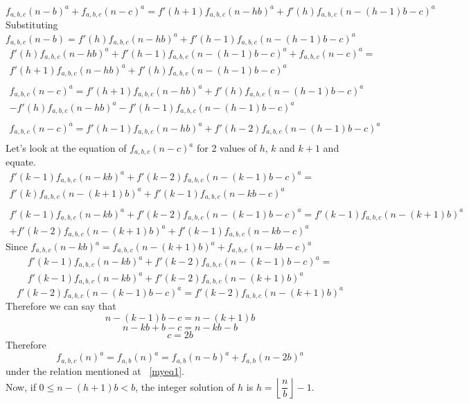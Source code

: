 \documentclass[preprint,12pt]{elsarticle}
\begin{document}
$$f_{a,b,c}(n-b)^a+f_{a,b,c}(n-c)^a=f'(h+1)f_{a,b,c}(n-hb)^a +f'(h)f_{a,b,c}(n-(h-1)b-c)^a$$
Substituting $f_{a,b,c}(n-b) = f'(h)f_{a,b,c}(n-hb)^a+f'(h-1)f_{a,b,c}(n-(h-1)b-c)^a$
\begin{multline*}
	f'(h)f_{a,b,c}(n-hb)^a+f'(h-1)f_{a,b,c}(n-(h-1)b-c)^a + f_{a,b,c}(n-c)^a =\\f'(h+1)f_{a,b,c}(n-hb)^a +f'(h)f_{a,b,c}(n-(h-1)b-c)^a\\\\
	f_{a,b,c}(n-c)^a = f'(h+1)f_{a,b,c}(n-hb)^a +f'(h)f_{a,b,c}(n-(h-1)b-c)^a \\-f'(h)f_{a,b,c}(n-hb)^a-f'(h-1)f_{a,b,c}(n-(h-1)b-c)^a\\\\
	f_{a,b,c}(n-c)^a = f'(h-1)f_{a,b,c}(n-hb)^a+f'(h-2)f_{a,b,c}(n-(h-1)b-c)^a\\
\end{multline*}
Let's look at the equation of $f_{a,b,c}(n-c)^a$ for 2 values of $h$, $k$ and $k+1$ and equate.
\begin{multline*}
	f'(k-1)f_{a,b,c}(n-kb)^a+f'(k-2)f_{a,b,c}(n-(k-1)b-c)^a =\\ f'(k)f_{a,b,c}(n-(k+1)b)^a+f'(k-1)f_{a,b,c}(n-kb-c)^a\\\\
	f'(k-1)f_{a,b,c}(n-kb)^a+f'(k-2)f_{a,b,c}(n-(k-1)b-c)^a =
	f'(k-1)f_{a,b,c}(n-(k+1)b)^a\\+f'(k-2)f_{a,b,c}(n-(k+1)b)^a +f'(k-1)f_{a,b,c}(n-kb-c)^a
\end{multline*}
Since $f_{a,b,c}(n-kb)^a = f_{a,b,c}(n-(k+1)b)^a+f_{a,b,c}(n-kb-c)^a$
\begin{multline*}
	f'(k-1)f_{a,b,c}(n-kb)^a+f'(k-2)f_{a,b,c}(n-(k-1)b-c)^a =\\ f'(k-1)f_{a,b,c}(n-kb)^a+f'(k-2)f_{a,b,c}(n-(k+1)b)^a
\end{multline*}
$$f'(k-2)f_{a,b,c}(n-(k-1)b-c)^a = f'(k-2)f_{a,b,c}(n-(k+1)b)^a$$
Therefore we can say that $$n-(k-1)b -c = n-(k+1)b$$
$$n-kb+b-c=n-kb-b$$
$$c = 2b$$
Therefore $$f_{a,b,c}(n)^a = f_{a,b}(n)^a = f_{a,b}(n-b)^a+f_{a,b}(n-2b)^a$$ under the relation mentioned at ~\eqref{myeq1}.\\
Now, if $0 \leq n-(h+1)b < b$, the integer solution of $h$ is $h = \left\lfloor\dfrac{n}{b}\right\rfloor - 1$.
\end{document}
